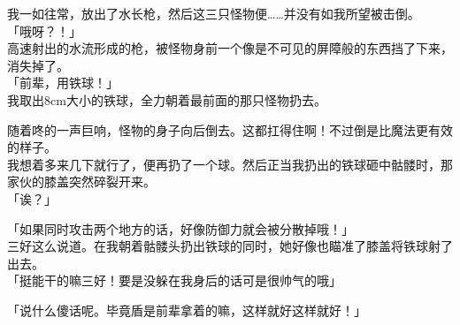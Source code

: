我一如往常，放出了水长枪，然后这三只怪物便……并没有如我所望被击倒。\\

「哦呀？！」\\

高速射出的水流形成的枪，被怪物身前一个像是不可见的屏障般的东西挡了下来，消失掉了。\\

「前辈，用铁球！」\\

我取出8cm大小的铁球，全力朝着最前面的那只怪物扔去。

随着咚的一声巨响，怪物的身子向后倒去。这都扛得住啊！不过倒是比魔法更有效的样子。\\

我想着多来几下就行了，便再扔了一个球。然后正当我扔出的铁球砸中骷髅时，那家伙的膝盖突然碎裂开来。\\

「诶？」

「如果同时攻击两个地方的话，好像防御力就会被分散掉哦！」\\

三好这么说道。在我朝着骷髅头扔出铁球的同时，她好像也瞄准了膝盖将铁球射了出去。\\

「挺能干的嘛三好！要是没躲在我身后的话可是很帅气的哦」

「说什么傻话呢。毕竟盾是前辈拿着的嘛，这样就好这样就好！」\\

